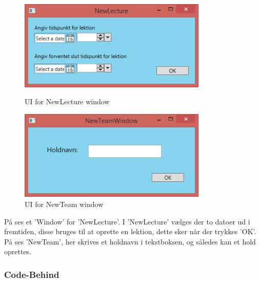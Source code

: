 \begin{figure}[htbp]
\centering
\begin{minipage}{.5\textwidth}
  \centering
  \includegraphics[width=0.8\textwidth]{images/UI/NewLecture.jpg}
  \caption[UINewLecture]{UI for NewLecture window}
  \label{fig:NewLecture}
\end{minipage}%
\begin{minipage}{.5\textwidth}
  \centering
  \includegraphics[width=0.8\textwidth]{images/UI/NewTeam.jpg}
  \caption[UINewTeam]{UI for NewTeam window}
  \label{fig:NewTeam}
\end{minipage}%
\end{figure}

På  ses et 'Window' for 'NewLecture'. 
I 'NewLecture' vælges der to datoer ud i fremtiden, disse bruges til at oprette en lektion, dette sker når der trykkes 'OK'. 
På  ses 'NewTeam', her skrives et holdnavn i tekstboksen, og således kan et hold oprettes.

\subsubsection{Code-Behind}
